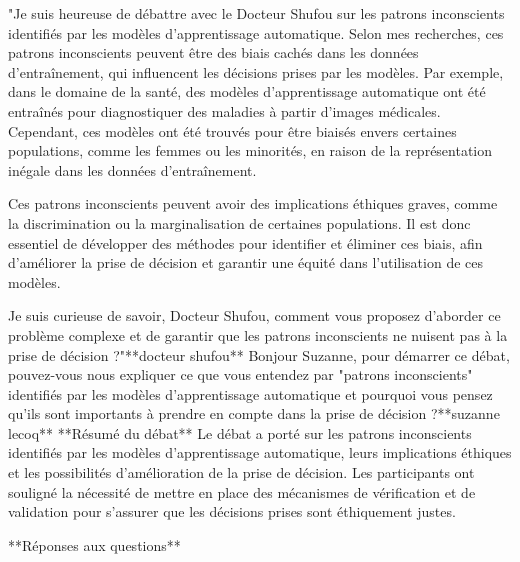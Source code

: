 "Je suis heureuse de débattre avec le Docteur Shufou sur les patrons inconscients identifiés par les modèles d'apprentissage automatique. Selon mes recherches, ces patrons inconscients peuvent être des biais cachés dans les données d'entraînement, qui influencent les décisions prises par les modèles. Par exemple, dans le domaine de la santé, des modèles d'apprentissage automatique ont été entraînés pour diagnostiquer des maladies à partir d'images médicales. Cependant, ces modèles ont été trouvés pour être biaisés envers certaines populations, comme les femmes ou les minorités, en raison de la représentation inégale dans les données d'entraînement.

Ces patrons inconscients peuvent avoir des implications éthiques graves, comme la discrimination ou la marginalisation de certaines populations. Il est donc essentiel de développer des méthodes pour identifier et éliminer ces biais, afin d'améliorer la prise de décision et garantir une équité dans l'utilisation de ces modèles.

Je suis curieuse de savoir, Docteur Shufou, comment vous proposez d'aborder ce problème complexe et de garantir que les patrons inconscients ne nuisent pas à la prise de décision ?"**docteur shufou**
Bonjour Suzanne, pour démarrer ce débat, pouvez-vous nous expliquer ce que vous entendez par "patrons inconscients" identifiés par les modèles d'apprentissage automatique et pourquoi vous pensez qu'ils sont importants à prendre en compte dans la prise de décision ?**suzanne lecoq**
**Résumé du débat**
Le débat a porté sur les patrons inconscients identifiés par les modèles d'apprentissage automatique, leurs implications éthiques et les possibilités d'amélioration de la prise de décision. Les participants ont souligné la nécessité de mettre en place des mécanismes de vérification et de validation pour s'assurer que les décisions prises sont éthiquement justes.

**Réponses aux questions**

